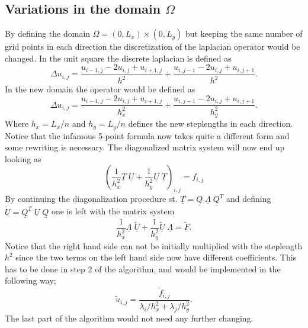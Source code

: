 \subsection{Variations in the domain $\Omega$}
By defining the domain $\Omega = (0,L_x)\times(0,L_y)$ but keeping the same number of grid points in each direction 
the discretization of the laplacian operator would be changed. In the unit square the discrete laplacian is defined as 
\begin{equation}
	\Delta u_{i,j} = \frac{u_{i-1,j}-2u_{i,j}+u_{i+1,j}}{h^2}+\frac{u_{i,j-1}-2u_{i,j}+u_{i,j+1}}{h^2}.
\end{equation}
In the new domain the operator would be defined as  
\begin{equation}
	\Delta u_{i,j} = \frac{u_{i-1,j}-2u_{i,j}+u_{i+1,j}}{h_x^2}+\frac{u_{i,j-1}-2u_{i,j}+u_{i,j+1}}{h_y^2}.
\end{equation}
Where $h_x=L_x/n$ and $h_y=L_y/n$ defines the new steplengths in each direction. Notice that the infamous 5-point formula now takes quite a 
different form and some rewriting is necessary. 
The diagonalized matrix system will now end up looking as 
\begin{equation}
	\left( \frac{1}{h_x^2}\underline{T} \; \underline{U}+\frac{1}{h_y^2}\underline{U}\; \underline{T} \right) _{i,j}=f_{i,j}
\end{equation}
By continuing the diagonalization procedure st. $\underline{T}=\underline{Q}\;\underline{\Lambda}\;\underline{Q}^T $
and defining $\underline{\tilde{U}}= \underline{Q}^T\;\underline{U}\;\underline{Q}$ one is left with the matrix system 
\begin{equation}
	\frac{1}{h_x^2}\underline{\Lambda} \; \underline{\tilde{U}}+\frac{1}{h_y^2}\underline{\tilde{U}}\; \underline{\Lambda} =\underline{\tilde{F}}.
\end{equation}
Notice that the right hand side can not be initially multiplied with the steplength $h^2$ since the two terms on the left hand side
now have different coefficients. This has to be done in step 2 of the algorithm, and would be implemented in the following way; 
\begin{equation}
	\tilde{u}_{i,j} = \frac{\tilde{f}_{i,j}}{\lambda_i/h_x^2+\lambda_j/h_y^2}.
\end{equation}
The last part of the algorithm would not need any further changing.

